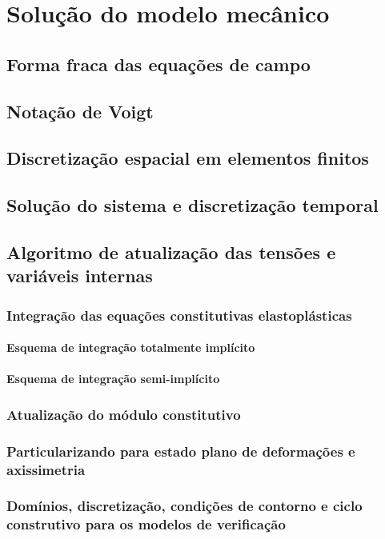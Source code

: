 \chapter{Solução do modelo mecânico}

\section{Forma fraca das equações de campo}


\section{Notação de Voigt}

\section{Discretização espacial em elementos finitos}

\section{Solução do sistema e discretização temporal}

\section{Algoritmo de atualização das tensões e variáveis internas}

\subsection{Integração das equações constitutivas elastoplásticas}


\subsubsection{Esquema de integração totalmente implícito}


\subsubsection{Esquema de integração semi-implícito}


\subsection{Atualização do módulo constitutivo}

\subsection{Particularizando para estado plano de deformações e axissimetria}

\subsection{Domínios, discretização, condições de contorno e ciclo construtivo para os modelos de verificação}


